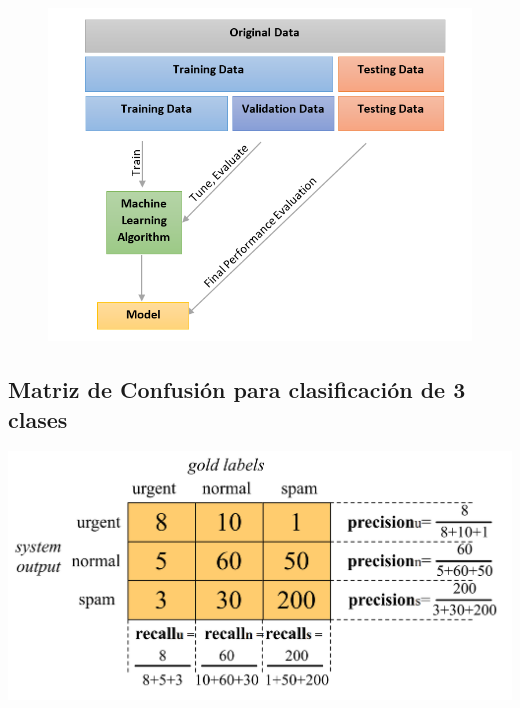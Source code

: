 \documentclass[11pt,fleqn]{book} %
\begin{document}
\begin{figure}[htb]
	\centering
	 \includegraphics[scale=0.55]{pics/validation.png}
\end{figure}



\subsection{Matriz de Confusión para clasificación de 3 clases}


\begin{center}
\includegraphics[scale=0.23]{pics/confmatrix.png}
\end{center}
\end{document}
